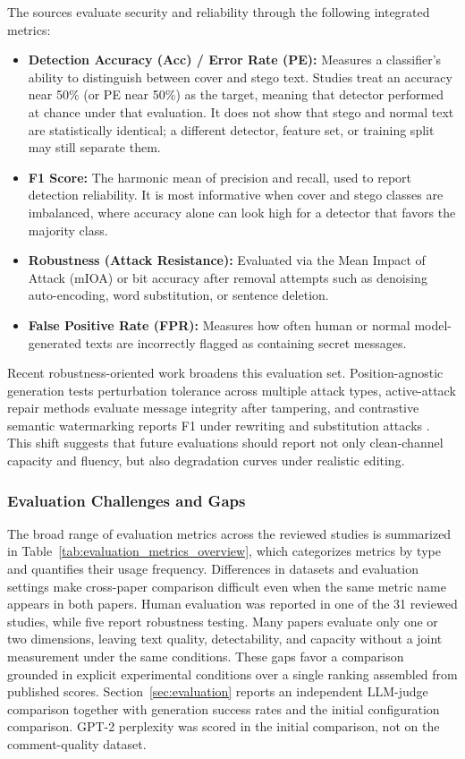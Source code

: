 The sources evaluate security and reliability through the following integrated metrics:
\begin{itemize}
  \item \textbf{Detection Accuracy (Acc) / Error Rate (PE):} Measures a classifier's ability to distinguish between cover and stego text. Studies treat an accuracy near 50\% (or PE near 50\%) as the target, meaning that detector performed at chance under that evaluation. It does not show that stego and normal text are statistically identical; a different detector, feature set, or training split may still separate them.
  \item \textbf{F1 Score:} The harmonic mean of precision and recall, used to report detection reliability. It is most informative when cover and stego classes are imbalanced, where accuracy alone can look high for a detector that favors the majority class.
  \item \textbf{Robustness (Attack Resistance):} Evaluated via the Mean Impact of Attack (mIOA) or bit accuracy after removal attempts such as denoising auto-encoding, word substitution, or sentence deletion.
  \item \textbf{False Positive Rate (FPR):} Measures how often human or normal model-generated texts are incorrectly flagged as containing secret messages.
\end{itemize}

Recent robustness-oriented work broadens this evaluation set. Position-agnostic generation tests perturbation tolerance across multiple attack types, active-attack repair methods evaluate message integrity after tampering, and contrastive semantic watermarking reports F1 under rewriting and substitution attacks \cite{lin2025positionagnostic,chen2025activetwo,wang2025contrastive}. This shift suggests that future evaluations should report not only clean-channel capacity and fluency, but also degradation curves under realistic editing.

\subsubsection{Evaluation Challenges and Gaps}

The broad range of evaluation metrics across the reviewed studies is summarized in Table~\ref{tab:evaluation_metrics_overview}, which categorizes metrics by type and quantifies their usage frequency. Differences in datasets and evaluation settings make cross-paper comparison difficult even when the same metric name appears in both papers. Human evaluation was reported in one of the 31 reviewed studies, while five report robustness testing. Many papers evaluate only one or two dimensions, leaving text quality, detectability, and capacity without a joint measurement under the same conditions. These gaps favor a comparison grounded in explicit experimental conditions over a single ranking assembled from published scores.
Section~\ref{sec:evaluation} reports an independent LLM-judge comparison together with generation success rates and the initial configuration comparison. GPT-2 perplexity was scored in the initial comparison, not on the comment-quality dataset.

